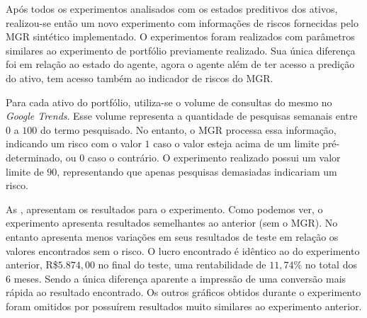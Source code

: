 \label{apendice:extra}

Após todos os experimentos analisados com os estados preditivos dos ativos, realizou-se então um novo experimento com informações de riscos fornecidas pelo \acrshort{MGR} sintético implementado. O experimentos foram realizados com parâmetros similares ao experimento de portfólio previamente realizado. Sua única diferença foi em relação ao estado do agente, agora o agente além de ter acesso a predição do ativo, tem acesso também ao indicador de riscos do \acrshort{MGR}.

Para cada ativo do portfólio, utiliza-se o volume de consultas do mesmo no \emph{Google Trends}. Esse volume representa a quantidade de pesquisas semanais entre $0$ a $100$ do termo pesquisado. No entanto, o \acrshort{MGR} processa essa informação, indicando um risco com o valor $1$ caso o valor esteja acima de um limite pré-determinado, ou $0$ caso o contrário. O experimento realizado possui um valor limite de $90$, representando que apenas pesquisas demasiadas indicariam um risco.

As , apresentam os resultados para o experimento. Como podemos ver, o experimento apresenta resultados semelhantes ao anterior (sem o \acrshort{MGR}). No entanto apresenta menos variações em seus resultados de teste em relação os valores encontrados sem o risco. O lucro encontrado é idêntico ao do experimento anterior, R\$$5.874,00$ no final do teste, uma rentabilidade de $11,74\%$ no total dos 6 meses. Sendo a única diferença aparente a impressão de uma conversão mais rápida ao resultado encontrado. Os outros gráficos obtidos durante o experimento foram omitidos por possuírem resultados muito similares ao experimento anterior. 

